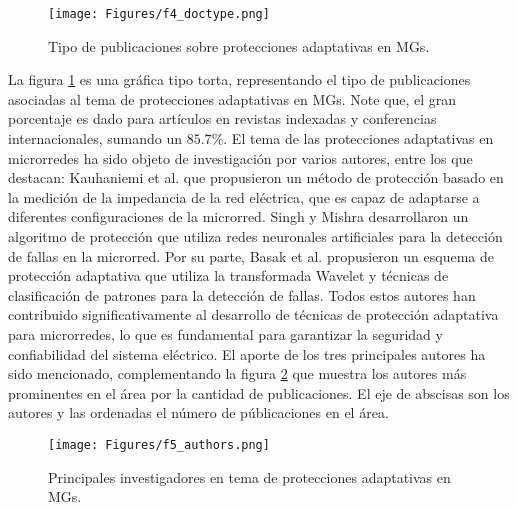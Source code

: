 \documentclass[journal,article,submit,pdftex,moreauthors]{Definitions/mdpi}
\begin{document}
\begin{figure}[H]
    \centering
    \texttt{[image: Figures/f4\_doctype.png]}
    \caption{Tipo de publicaciones sobre protecciones adaptativas en MGs.}
    \label{fig:rvw_doctype}
\end{figure}
\unskip

La figura \ref{fig:rvw_doctype} es una gráfica tipo torta, representando el tipo de publicaciones asociadas al tema de protecciones adaptativas en MGs. Note que, el gran porcentaje es dado para artículos en revistas indexadas y conferencias internacionales, sumando un $85.7\%$. El tema de las protecciones adaptativas en microrredes ha sido objeto de investigación por varios autores, entre los que destacan: Kauhaniemi et al. \cite{kauhaniemi2016adaptive} que propusieron un método de protección basado en la medición de la impedancia de la red eléctrica, que es capaz de adaptarse a diferentes configuraciones de la microrred. Singh y Mishra \cite{singh2018novel} desarrollaron un algoritmo de protección que utiliza redes neuronales artificiales para la detección de fallas en la microrred. Por su parte, Basak et al. \cite{basak2020adaptive} propusieron un esquema de protección adaptativa que utiliza la transformada Wavelet y técnicas de clasificación de patrones para la detección de fallas. Todos estos autores han contribuido significativamente al desarrollo de técnicas de protección adaptativa para microrredes, lo que es fundamental para garantizar la seguridad y confiabilidad del sistema eléctrico. El aporte de los tres principales autores ha sido mencionado, complementando la figura \ref{fig:rvw_authors} que muestra los autores más prominentes en el área por la cantidad de publicaciones. El eje de abscisas son los autores y las ordenadas el número de públicaciones en el área. 


\begin{figure}[H]
    \centering
    \texttt{[image: Figures/f5\_authors.png]}
    \caption{Principales investigadores en tema de protecciones adaptativas en MGs.}
    \label{fig:rvw_authors}
\end{figure}
\unskip
\end{document}
